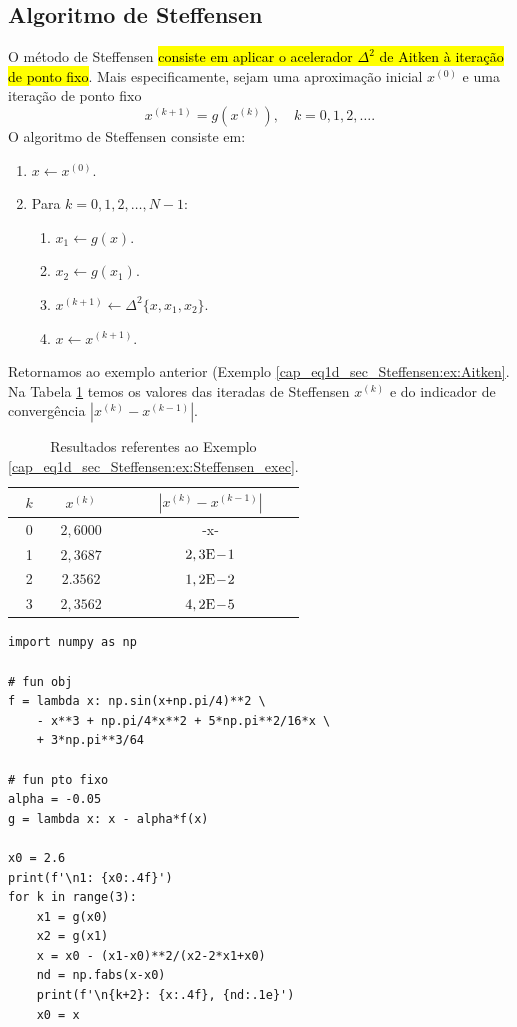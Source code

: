 \subsection{Algoritmo de Steffensen}

O método de Steffensen \hl{consiste em aplicar o acelerador $\Delta^2$ de Aitken à iteração de ponto fixo}. Mais especificamente, sejam uma aproximação inicial $x^{(0)}$ e uma iteração de ponto fixo
\begin{equation}
  x^{(k+1)} = g(x^{(k)}),\quad k=0, 1, 2, \ldots.
\end{equation}
O algoritmo de Steffensen consiste em:
\begin{enumerate}
\item $x \leftarrow x^{(0)}$.
\item Para $k=0, 1, 2, \dotsc, N-1$:
  \begin{enumerate}
  \item $x_1 \leftarrow g(x)$.
  \item $x_2 \leftarrow g(x_1)$.
  \item $x^{(k+1)} \leftarrow \Delta^2\{x,x_1,x_2\}$.
  \item $x \leftarrow x^{(k+1)}$.
  \end{enumerate}
\end{enumerate}


\begin{ex}\label{cap_eq1d_sec_Steffensen:ex:Steffensen_exec}
  Retornamos ao exemplo anterior (Exemplo \ref{cap_eq1d_sec_Steffensen:ex:Aitken}. Na Tabela \ref{cap_eq1d_sec_Steffensen:tab:ex_Steffensen_exec} temos os valores das iteradas de Steffensen $x^{(k)}$ e do indicador de convergência $|x^{(k)}-x^{(k-1)}|$.

\begin{table}[h!]
  \centering
  \caption{Resultados referentes ao Exemplo \ref{cap_eq1d_sec_Steffensen:ex:Steffensen_exec}.}
  \label{cap_eq1d_sec_Steffensen:tab:ex_Steffensen_exec}
  \begin{tabular}{r|cc}
    $k$ & $x^{(k)}$ & $|x^{(k)}-x^{(k-1)}|$ \\\hline
    0 & $2,6000$ & -x- \\
    1 & $2,3687$ & $2,3\mathrm{E}\!-\!1$ \\
    2 & $2.3562$ & $1,2\mathrm{E}\!-\!2$ \\
    3 & $2,3562$ & $4,2\mathrm{E}\!-\!5$ \\\hline
  \end{tabular}
\end{table}

\begin{lstlisting}
import numpy as np

# fun obj
f = lambda x: np.sin(x+np.pi/4)**2 \
    - x**3 + np.pi/4*x**2 + 5*np.pi**2/16*x \
    + 3*np.pi**3/64

# fun pto fixo
alpha = -0.05
g = lambda x: x - alpha*f(x)

x0 = 2.6
print(f'\n1: {x0:.4f}')
for k in range(3):
    x1 = g(x0)
    x2 = g(x1)
    x = x0 - (x1-x0)**2/(x2-2*x1+x0)
    nd = np.fabs(x-x0)
    print(f'\n{k+2}: {x:.4f}, {nd:.1e}')
    x0 = x
\end{lstlisting}
\end{ex}

